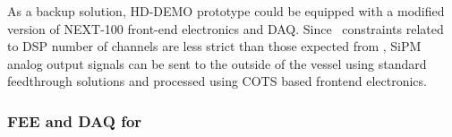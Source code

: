 As a backup solution, HD-DEMO prototype could be equipped with a modified version of NEXT-100 front-end electronics and DAQ. Since \HDEMO\ constraints related to DSP number of channels are less strict than those expected from \NHD, SiPM analog output signals can be sent to the outside of the vessel using standard feedthrough solutions and processed using COTS based frontend electronics. 



 
\subsubsection*{FEE and DAQ for \NHD}


